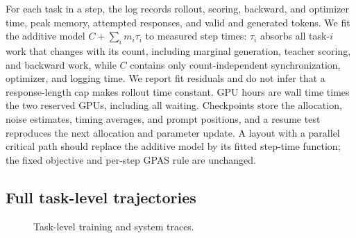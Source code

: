 For each task in a step, the log records rollout, scoring, backward, and
optimizer time, peak memory, attempted responses, and valid and generated
tokens. We fit the additive model $C+\sum_i m_i\tau_i$ to measured step times:
$\tau_i$ absorbs all task-$i$ work that changes with its count, including
marginal generation, teacher scoring, and backward work, while $C$ contains
only count-independent synchronization, optimizer, and logging time. We report
fit residuals and do not infer that a response-length cap makes rollout time
constant. GPU hours are wall time times the two reserved GPUs, including all
waiting. Checkpoints store the allocation, noise estimates, timing averages,
and prompt positions, and a resume test reproduces the next allocation and
parameter update. A layout with a parallel critical path should replace the
additive model by its fitted step-time function; the fixed objective and
per-step GPAS rule are unchanged.

\subsection{Full task-level trajectories}

\begin{figure}[H]
    \centering
    \caption{Task-level training and system traces.
    }
    \label{fig:appendix_task_curves}
\end{figure}
